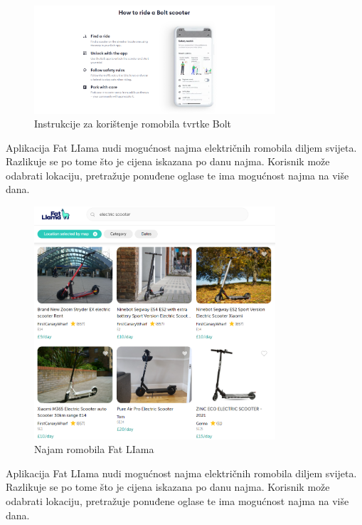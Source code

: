 		\begin{figure}[t]
			\centering
			\includegraphics[width=0.8\textwidth]{slike/bolt-2.png}
			\caption{Instrukcije za korištenje romobila tvrtke Bolt}
			\label{fig:bolt-2}
		\end{figure}
		
		\indent Aplikacija Fat LIama nudi mogućnost najma električnih romobila diljem svijeta. Razlikuje se po tome što je cijena iskazana po danu najma. Korisnik može odabrati lokaciju, pretražuje ponuđene oglase te ima mogućnost najma na više dana.\\
		
		\begin{figure}[t]
			\centering
			\includegraphics[width=0.8\textwidth]{slike/fat-liam.png}
			\caption{Najam romobila Fat LIama}
			\label{fig:fat-liama}
		\end{figure}
		
		
		\indent Aplikacija Fat LIama nudi mogućnost najma električnih romobila diljem svijeta. Razlikuje se po tome što je cijena iskazana po danu najma. Korisnik može odabrati lokaciju, pretražuje ponuđene oglase te ima mogućnost najma na više dana.\\
		
		
		
		
	